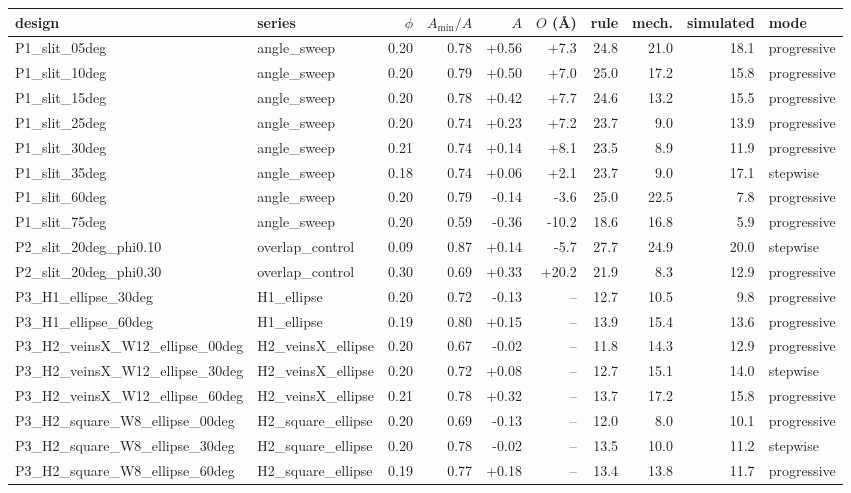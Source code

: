 \begin{tabular}{llrrrrrrrl}
\toprule
design & series & $\phi$ & $A_\mathrm{min}/A$ & $A$ & $O$ (\AA) & rule & mech. & simulated & mode\\ \midrule
P1\_slit\_05deg & angle\_sweep & 0.20 & 0.78 & +0.56 & +7.3 & 24.8 & 21.0 & 18.1 & progressive\\
P1\_slit\_10deg & angle\_sweep & 0.20 & 0.79 & +0.50 & +7.0 & 25.0 & 17.2 & 15.8 & progressive\\
P1\_slit\_15deg & angle\_sweep & 0.20 & 0.78 & +0.42 & +7.7 & 24.6 & 13.2 & 15.5 & progressive\\
P1\_slit\_25deg & angle\_sweep & 0.20 & 0.74 & +0.23 & +7.2 & 23.7 & 9.0 & 13.9 & progressive\\
P1\_slit\_30deg & angle\_sweep & 0.21 & 0.74 & +0.14 & +8.1 & 23.5 & 8.9 & 11.9 & progressive\\
P1\_slit\_35deg & angle\_sweep & 0.18 & 0.74 & +0.06 & +2.1 & 23.7 & 9.0 & 17.1 & stepwise\\
P1\_slit\_60deg & angle\_sweep & 0.20 & 0.79 & -0.14 & -3.6 & 25.0 & 22.5 & 7.8 & progressive\\
P1\_slit\_75deg & angle\_sweep & 0.20 & 0.59 & -0.36 & -10.2 & 18.6 & 16.8 & 5.9 & progressive\\
P2\_slit\_20deg\_phi0.10 & overlap\_control & 0.09 & 0.87 & +0.14 & -5.7 & 27.7 & 24.9 & 20.0 & stepwise\\
P2\_slit\_20deg\_phi0.30 & overlap\_control & 0.30 & 0.69 & +0.33 & +20.2 & 21.9 & 8.3 & 12.9 & progressive\\
P3\_H1\_ellipse\_30deg & H1\_ellipse & 0.20 & 0.72 & -0.13 & -- & 12.7 & 10.5 & 9.8 & progressive\\
P3\_H1\_ellipse\_60deg & H1\_ellipse & 0.19 & 0.80 & +0.15 & -- & 13.9 & 15.4 & 13.6 & progressive\\
P3\_H2\_veinsX\_W12\_ellipse\_00deg & H2\_veinsX\_ellipse & 0.20 & 0.67 & -0.02 & -- & 11.8 & 14.3 & 12.9 & progressive\\
P3\_H2\_veinsX\_W12\_ellipse\_30deg & H2\_veinsX\_ellipse & 0.20 & 0.72 & +0.08 & -- & 12.7 & 15.1 & 14.0 & stepwise\\
P3\_H2\_veinsX\_W12\_ellipse\_60deg & H2\_veinsX\_ellipse & 0.21 & 0.78 & +0.32 & -- & 13.7 & 17.2 & 15.8 & progressive\\
P3\_H2\_square\_W8\_ellipse\_00deg & H2\_square\_ellipse & 0.20 & 0.69 & -0.13 & -- & 12.0 & 8.0 & 10.1 & progressive\\
P3\_H2\_square\_W8\_ellipse\_30deg & H2\_square\_ellipse & 0.20 & 0.78 & -0.02 & -- & 13.5 & 10.0 & 11.2 & stepwise\\
P3\_H2\_square\_W8\_ellipse\_60deg & H2\_square\_ellipse & 0.19 & 0.77 & +0.18 & -- & 13.4 & 13.8 & 11.7 & progressive\\
\bottomrule
\end{tabular}